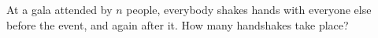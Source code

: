 At a gala attended by $n$ people, everybody shakes hands with everyone else before the event, and again after it. How many handshakes take place?

